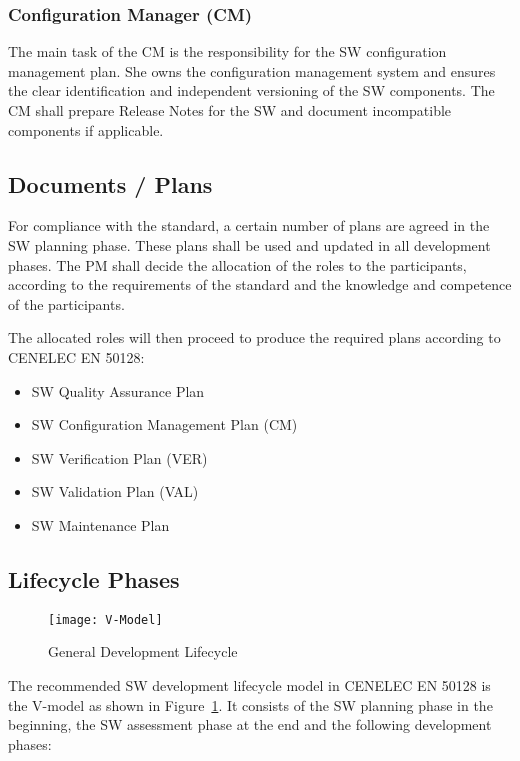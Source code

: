 \subsubsection{Configuration Manager (CM)}
\label{sec:conf-manag}

The main task of the CM is the responsibility for the SW configuration
management plan. She owns the configuration management system and ensures the
clear identification and independent versioning of the SW components. The CM
shall prepare Release Notes for the SW and document incompatible components if
applicable.

\subsection{Documents / Plans}
\label{sec:documents--plan}

For compliance with the standard, a certain number of plans are agreed in the SW
planning phase. These plans shall be used and updated in all development
phases. The PM shall decide the allocation of the roles to the participants,
according to the requirements of the standard and the knowledge and competence
of the participants.

The allocated roles will then proceed to produce the required plans according to
CENELEC EN 50128:

\begin{itemize}
\item SW Quality Assurance Plan
\item SW Configuration Management Plan (CM)
\item SW Verification Plan (VER)
\item SW Validation Plan (VAL)
\item SW Maintenance Plan
\end{itemize}


\subsection{Lifecycle Phases}
\label{sec:lifecycle-phases}

\begin{figure}[ht]
  \centering
  \texttt{[image: V-Model]}
  \caption{General Development Lifecycle~\cite{EN-50128}}
  \label{fig:develop-lifecycle-cenelec}
\end{figure}

The recommended SW development lifecycle model in CENELEC EN 50128 is the
V-model as shown in Figure~\ref{fig:develop-lifecycle-cenelec}. It consists of
the SW planning phase in the beginning, the SW assessment phase at the end and
the following development phases:


